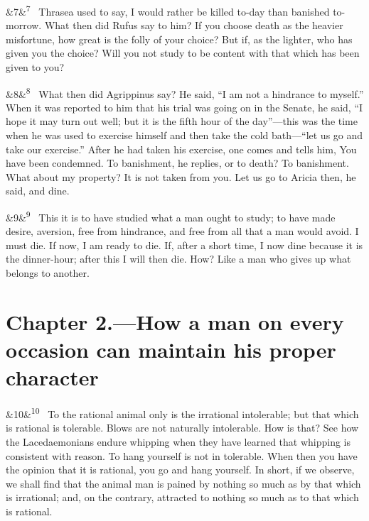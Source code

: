 \documentclass[12pt]{article}
\newcommand{\para}[1][]{\par\noindent\ifx&#1&\else\textsuperscript{\footnotesize #1}~\fi}
\begin{document}
\para[7] Thrasea used to say, I would rather be killed to-day than banished to-morrow. What then did Rufus say to him? If you choose death as the heavier misfortune, how great is the folly of your choice? But if, as the lighter, who has given you the choice? Will you not study to be content with that which has been given to you?

\para[8] What then did Agrippinus say? He said, “I am not a hindrance to myself.” When it was reported to him that his trial was going on in the Senate, he said, “I hope it may turn out well; but it is the fifth hour of the day”—this was the time when he was used to exercise himself and then take the cold bath—“let us go and take our exercise.” After he had taken his exercise, one comes and tells him, You have been condemned. To banishment, he replies, or to death? To banishment. What about my property? It is not taken from you. Let us go to Aricia then, he said, and dine.

\para[9] This it is to have studied what a man ought to study; to have made desire, aversion, free from hindrance, and free from all that a man would avoid. I must die. If now, I am ready to die. If, after a short time, I now dine because it is the dinner-hour; after this I will then die. How? Like a man who gives up what belongs to another.

\section*{Chapter 2.---How a man on every occasion can maintain his proper character}

\para[10] To the rational animal only is the irrational intolerable; but that which is rational is tolerable. Blows are not naturally intolerable. How is that? See how the Lacedaemonians endure whipping when they have learned that whipping is consistent with reason. To hang yourself is not in tolerable. When then you have the opinion that it is rational, you go and hang yourself. In short, if we observe, we shall find that the animal man is pained by nothing so much as by that which is irrational; and, on the contrary, attracted to nothing so much as to that which is rational.
\end{document}
